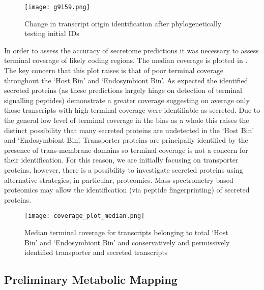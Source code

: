 \documentclass[a4paper,11pt]{article}
\begin{document}
\begin{figure}
  \begin{center}
    \texttt{[image: g9159.png]}
    \caption{Change in transcript origin identification after phylogenetically testing initial IDs}
        \label{fig:phylogenetic_confirmation}
  \end{center}
\end{figure}

In order to assess the accuracy of secretome predictions it was necessary to assess terminal coverage of likely coding regions.  
The median coverage is plotted in .  The key concern that this plot raises is that of poor terminal coverage throughout the `Host Bin' and `Endosymbiont Bin'. 
As expected the identified secreted proteins (as these predictions largely hinge on detection of terminal signalling peptides) demonstrate a greater coverage suggesting on average only those transcripts with high terminal coverage were identifiable as secreted.  
Due to the general low level of terminal coverage in the bins as a whole this raises the distinct possibility that many secreted proteins are undetected in the `Host Bin' and `Endosymbiont Bin'. 
Transporter proteins are principally identified by the presence of trans-membrane domains so terminal coverage is not a concern for their identification. 
For this reason, we are initially focusing on transporter proteins, however, there is a possibility to investigate secreted proteins using alternative strategies, in particular, proteomics.  
Mass-spectrometry based proteomics may allow the identification (via peptide fingerprinting) of secreted proteins.

\newpage 

\begin{figure}
  \begin{center}
    \texttt{[image: coverage\_plot\_median.png]}
    \caption{Median terminal coverage for transcripts belonging to total `Host Bin' and `Endosymbiont Bin' and conservatively and permissively identified transporter and secreted transcripts}
        \label{fig:coverage}
  \end{center}
\end{figure}

\newpage

\subsection{Preliminary Metabolic Mapping}
\end{document}
